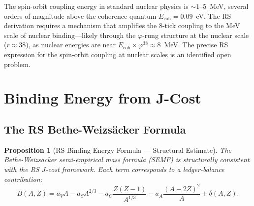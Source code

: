 \documentclass[12pt,a4paper]{article}
\newtheorem{proposition}[theorem]{Proposition}
\theoremstyle{definition}
\theoremstyle{remark}
\begin{document}
The spin-orbit coupling energy in standard nuclear physics is $\sim 1$--$5$~MeV,
several orders of magnitude above the coherence quantum $E_{\mathrm{coh}} = 0.09$~eV.
The RS derivation requires a mechanism that amplifies the 8-tick coupling to the
MeV scale of nuclear binding---likely through the $\varphi$-rung structure at the
nuclear scale ($r \approx 38$), as nuclear energies are near $E_{\mathrm{coh}} \times
\varphi^{38} \approx 8$~MeV.  The precise RS expression for the spin-orbit coupling
at nuclear scales is an identified open problem.

\section{Binding Energy from J-Cost}

\subsection{The RS Bethe-Weizsäcker Formula}

\begin{proposition}[RS Binding Energy Formula --- Structural Estimate]
\label{thm:binding}
The Bethe-Weizsäcker semi-empirical mass formula (SEMF) is
structurally consistent with the RS $J$-cost framework.  Each
term corresponds to a ledger-balance contribution:
\begin{equation}
B(A,Z) = a_V A - a_S A^{2/3} - a_C \frac{Z(Z-1)}{A^{1/3}} - a_A \frac{(A-2Z)^2}{A} + \delta(A,Z).
\end{equation}
\end{proposition}
\end{document}
